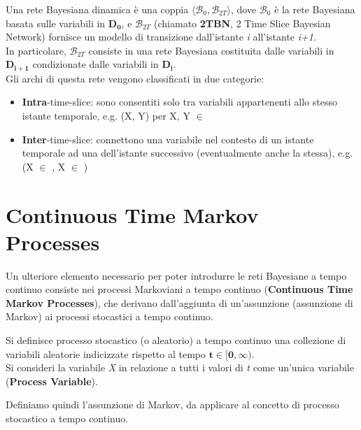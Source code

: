   \begin{definition}  \cite{nodelman-2007}
    Una rete Bayesiana dinamica è una coppia $\langle\mathcal{B}_0, \mathcal{B}_{2T}\rangle$,
    dove $\mathcal{B}_0$ è la rete Bayesiana basata sulle variabili in $\bm{D_0}$, e $\mathcal{B}_{2T}$
    (chiamato \textbf{2TBN}, 2 Time Slice Bayesian Network) fornisce un modello di transizione dall'istante \textit{i} all'istante \textit{i+1}.\\
    In particolare, $\mathcal{B}_{2T}$ consiste in una rete Bayesiana costituita dalle variabili in $\bm{D_{i+1}}$ 
    condizionate dalle variabili in $\bm{D_i}$.\\
    Gli archi di questa rete vengono classificati in due categorie:
    \begin{itemize}
      \item \textbf{Intra}-time-slice: sono consentiti solo tra variabili appartenenti allo stesso 
        istante temporale, e.g. (X, Y) per X, Y $\in$ 
      \item \textbf{Inter}-time-slice: connettono una variabile nel contesto di un istante temporale ad
        una dell'istante successivo (eventualmente anche la stessa), e.g. (X $\in$ , X $\in$ )
    \end{itemize}
  \end{definition}

  \section{Continuous Time Markov Processes}
  Un ulteriore elemento necessario per poter introdurre le reti Bayesiane a tempo continuo consiste nei
  processi Markoviani a tempo continuo (\textbf{Continuous Time Markov Processes}), che derivano dall'aggiunta
  di un'assunzione (assunzione di Markov) ai processi stocastici a tempo continuo.
  
  \begin{definition} \cite{stochastic-processes}
    Si definisce processo stocastico (o aleatorio) a tempo continuo una collezione di variabili aleatorie
    indicizzate rispetto al tempo $\bm{t \in [0, \infty)}$.\\
    Si consideri la variabile \textit{X} in relazione a tutti i valori di \textit{t} come 
    un'unica variabile (\textbf{Process Variable}).
  \end{definition}

  Definiamo quindi l'assunzione di Markov, da applicare al concetto di processo stocastico a tempo continuo.

